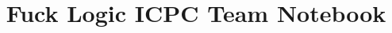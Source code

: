 \documentclass[a4paper,10pt]{article}
\title{\vspace{-4ex}\Large{Fuck Logic ICPC Team Notebook}}
\author{}
\date{}
\begin{document}
\begin{landscape}
\begin{multicols}{2}

\maketitle
\vspace{-13ex}
\tableofcontents
\pagestyle{fancy}




\end{multicols}

\end{landscape}
\end{document}

